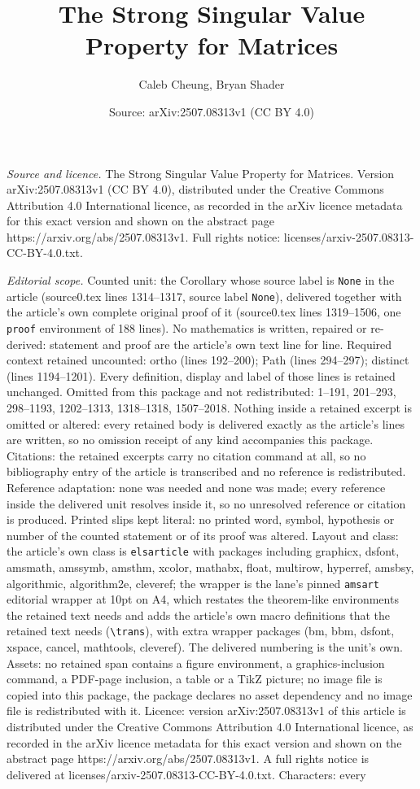 \documentclass[10pt,a4paper]{amsart}
\title[The Strong Singular Value Property for Matrices]{The Strong Singular Value Property for Matrices}
\author{Caleb Cheung, Bryan Shader}
\date{Source: arXiv:2507.08313v1 (CC BY 4.0)}
\begin{document}
\maketitle

\noindent\emph{Source and licence.} The Strong Singular Value Property for Matrices. Version arXiv:2507.08313v1 (CC BY 4.0), distributed under the Creative Commons Attribution 4.0 International licence, as recorded in the arXiv licence metadata for this exact version and shown on the abstract page https://arxiv.org/abs/2507.08313v1. Full rights notice: licenses/arxiv-2507.08313-CC-BY-4.0.txt.\par\smallskip

\noindent\textit{Editorial scope.} Counted unit: the Corollary whose source label is \texttt{None} in the article (source0.tex lines 1314--1317, source label \texttt{None}), delivered together with the article's own complete original proof of it (source0.tex lines 1319--1506, one \texttt{proof} environment of 188 lines). No mathematics is written, repaired or re-derived: statement and proof are the article's own text line for line. Required context retained uncounted: ortho (lines 192--200); Path (lines 294--297); distinct (lines 1194--1201). Every definition, display and label of those lines is retained unchanged. Omitted from this package and not redistributed: 1--191, 201--293, 298--1193, 1202--1313, 1318--1318, 1507--2018. Nothing inside a retained excerpt is omitted or altered: every retained body is delivered exactly as the article's lines are written, so no omission receipt of any kind accompanies this package. Citations: the retained excerpts carry no citation command at all, so no bibliography entry of the article is transcribed and no reference is redistributed. Reference adaptation: none was needed and none was made; every reference inside the delivered unit resolves inside it, so no unresolved reference or citation is produced. Printed slips kept literal: no printed word, symbol, hypothesis or number of the counted statement or of its proof was altered. Layout and class: the article's own class is \texttt{elsarticle} with packages including graphicx, dsfont, amsmath, amssymb, amsthm, xcolor, mathabx, float, multirow, hyperref, amsbsy, algorithmic, algorithm2e, cleveref; the wrapper is the lane's pinned \texttt{amsart} editorial wrapper at 10pt on A4, which restates the theorem-like environments the retained text needs and adds the article's own macro definitions that the retained text needs (\texttt{\textbackslash trans}), with extra wrapper packages (bm, bbm, dsfont, xspace, cancel, mathtools, cleveref). The delivered numbering is the unit's own. Assets: no retained span contains a figure environment, a graphics-inclusion command, a PDF-page inclusion, a table or a TikZ picture; no image file is copied into this package, the package declares no asset dependency and no image file is redistributed with it. Licence: version arXiv:2507.08313v1 of this article is distributed under the Creative Commons Attribution 4.0 International licence, as recorded in the arXiv licence metadata for this exact version and shown on the abstract page https://arxiv.org/abs/2507.08313v1. A full rights notice is delivered at licenses/arxiv-2507.08313-CC-BY-4.0.txt. Characters: every 
\end{document}
